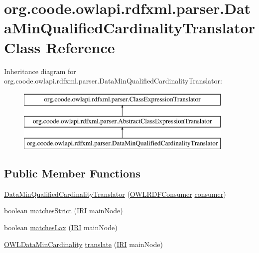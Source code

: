 \hypertarget{classorg_1_1coode_1_1owlapi_1_1rdfxml_1_1parser_1_1_data_min_qualified_cardinality_translator}{\section{org.\-coode.\-owlapi.\-rdfxml.\-parser.\-Data\-Min\-Qualified\-Cardinality\-Translator Class Reference}
\label{classorg_1_1coode_1_1owlapi_1_1rdfxml_1_1parser_1_1_data_min_qualified_cardinality_translator}
}
Inheritance diagram for org.\-coode.\-owlapi.\-rdfxml.\-parser.\-Data\-Min\-Qualified\-Cardinality\-Translator\-:\begin{figure}[H]
\begin{center}
\leavevmode
\includegraphics[height=3.000000cm]{classorg_1_1coode_1_1owlapi_1_1rdfxml_1_1parser_1_1_data_min_qualified_cardinality_translator}
\end{center}
\end{figure}
\subsection*{Public Member Functions}
\begin{DoxyCompactItemize}
\item 
\hyperlink{classorg_1_1coode_1_1owlapi_1_1rdfxml_1_1parser_1_1_data_min_qualified_cardinality_translator_a9808bcd2ced132174953e193e58436cb}{Data\-Min\-Qualified\-Cardinality\-Translator} (\hyperlink{classorg_1_1coode_1_1owlapi_1_1rdfxml_1_1parser_1_1_o_w_l_r_d_f_consumer}{O\-W\-L\-R\-D\-F\-Consumer} \hyperlink{classorg_1_1coode_1_1owlapi_1_1rdfxml_1_1parser_1_1_abstract_class_expression_translator_ae547084cdd5b92c03835b5aa404f823b}{consumer})
\item 
boolean \hyperlink{classorg_1_1coode_1_1owlapi_1_1rdfxml_1_1parser_1_1_data_min_qualified_cardinality_translator_aed553b5cc4daed266f68f971c46fed37}{matches\-Strict} (\hyperlink{classorg_1_1semanticweb_1_1owlapi_1_1model_1_1_i_r_i}{I\-R\-I} main\-Node)
\item 
boolean \hyperlink{classorg_1_1coode_1_1owlapi_1_1rdfxml_1_1parser_1_1_data_min_qualified_cardinality_translator_a8ea655013e617b9c5d451284e657075f}{matches\-Lax} (\hyperlink{classorg_1_1semanticweb_1_1owlapi_1_1model_1_1_i_r_i}{I\-R\-I} main\-Node)
\item 
\hyperlink{interfaceorg_1_1semanticweb_1_1owlapi_1_1model_1_1_o_w_l_data_min_cardinality}{O\-W\-L\-Data\-Min\-Cardinality} \hyperlink{classorg_1_1coode_1_1owlapi_1_1rdfxml_1_1parser_1_1_data_min_qualified_cardinality_translator_a6679cfe9026a050fa6d0068abd0e92c5}{translate} (\hyperlink{classorg_1_1semanticweb_1_1owlapi_1_1model_1_1_i_r_i}{I\-R\-I} main\-Node)
\end{DoxyCompactItemize}
